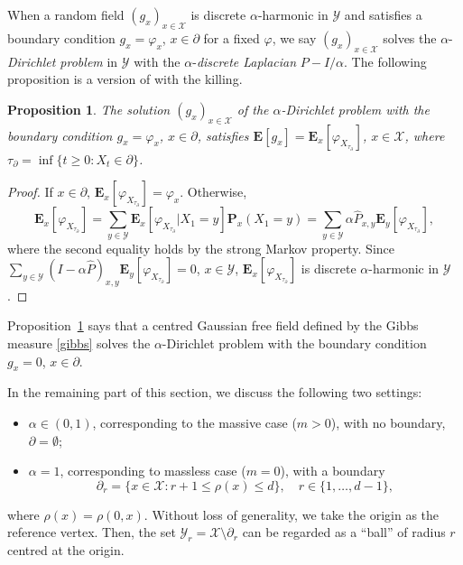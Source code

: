 \documentclass[a4paper,11pt]{article}
\theoremstyle{plain}
\newtheorem{proposition}[theorem]{Proposition}
\theoremstyle{definition}
\begin{document}
When a random field $(g_x)_{x\in \mathcal{X}}$ is
discrete $\alpha$-harmonic in $\mathcal{Y}$ and
satisfies a boundary condition $g_x=\varphi_x$,
$x\in\partial$ for a fixed $\varphi$, we say
$(g_x)_{x\in\mathcal{X}}$ solves
the $\alpha$-{\it Dirichlet problem} in $\mathcal{Y}$
with the $\alpha$-{\it discrete Laplacian}
$P-I/\alpha$. The following proposition is a version
of \cite[Theorem 8.26]{FV17} with the killing.

\begin{proposition}\label{prop:solve}
  The solution $(g_x)_{x\in\mathcal{X}}$ of
  the $\alpha$-Dirichlet problem with the boundary
  condition $g_x=\varphi_x$, $x\in\partial$, satisfies
  $\mathbf{E}[g_x]=\mathbf{E}_x[\varphi_{X_{\tau_\partial}}]$,
  $x\in \mathcal{X}$,
  where $\tau_{\partial}=\inf\{t\ge 0:X_t\in\partial\}$.
\end{proposition}

\begin{proof}
  If $x\in\partial$,
  $\mathbf{E}_x[\varphi_{X_{\tau_\partial}}]=\varphi_x$.
  Otherwise,
  \[
    \mathbf{E}_x[\varphi_{X_{\tau_\partial}}]=
    \sum_{y\in\mathcal{Y}}
    \mathbf{E}_x[\varphi_{X_{\tau_\partial}}|X_1=y]
    \mathbf{P}_x(X_1=y)
    =\sum_{y\in \mathcal{Y}}\alpha\hat{P}_{x,y}
    \mathbf{E}_y[\varphi_{X_{\tau_\partial}}],
  \]
  where the second equality holds by the strong Markov property.
  Since
  $\sum_{y\in\mathcal{Y}}(I-\alpha \hat{P})_{x,y}\mathbf{E}_y
  [\varphi_{X_{\tau_\partial}}]=0$, $x\in \mathcal{Y}$,
  $\mathbf{E}_x[\varphi_{X_{\tau_\partial}}]$
  is discrete $\alpha$-harmonic in $\mathcal{Y}$.
\end{proof}

Proposition~\ref{prop:solve} says that a centred Gaussian
free field defined by the Gibbs measure \eqref{gibbs}
solves the $\alpha$-Dirichlet problem with the boundary
condition $g_x=0$, $x\in\partial$.

In the remaining part of this section, we discuss
the following two settings:
\begin{itemize}
\item[(a)] $\alpha\in(0,1)$, corresponding to the massive
  case ($m>0$),
  with no boundary, $\partial=\emptyset$;
\item[(b)] $\alpha=1$, corresponding to massless case
  ($m=0$), with a boundary
    \begin{equation}\label{boundary}
      \partial_r
      =\{x\in \mathcal{X}:r+1\le \rho(x) \le d\},
      \quad r \in \{1,\ldots,d-1\},
    \end{equation}
\end{itemize}
where $\rho(x)=\rho(0,x)$. Without loss of generality,
we take the origin as the reference vertex. Then,
the set $\mathcal{Y}_r=\mathcal{X}\setminus\partial_r$
can be regarded as a ``ball'' of radius $r$ centred
at the origin.
\end{document}
